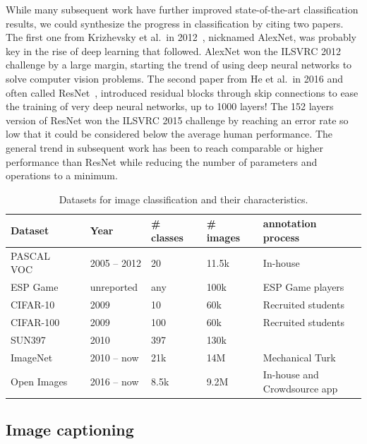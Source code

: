 While many subsequent work have further improved state-of-the-art classification results,
we could synthesize the progress in classification by citing two papers.
The first one from Krizhevsky et al.\ in 2012~\cite{krizhevsky2012imagenet},
nicknamed AlexNet, was probably key in the rise of deep learning that followed.
AlexNet won the ILSVRC 2012 challenge by a large margin,
starting the trend of using deep neural networks to solve computer vision problems.
The second paper from He et al.\ in 2016 and often called ResNet~\cite{he2016deep},
introduced residual blocks through skip connections
to ease the training of very deep neural networks, up to 1000 layers!
The 152 layers version of ResNet won the ILSVRC 2015 challenge
by reaching an error rate so low that
it could be considered below the average human performance.
The general trend in subsequent work has been to reach comparable
or higher performance than ResNet while
reducing the number of parameters and operations to a minimum.

\begin{table}
\centering
\caption{Datasets for image classification and their characteristics.}
\begin{tabular}{lllll}
	Dataset & Year & \# classes & \# images &  annotation process \\
	\midrule
	PASCAL VOC~\cite{Everingham10} & 2005 -- 2012 & 20 & 11.5k &  In-house \\
	ESP Game~\cite{von2005esp} & unreported & any & 100k &  ESP Game players \\
	CIFAR-10~\cite{krizhevsky2009learning} & 2009 & 10 & 60k  & Recruited students \\
	CIFAR-100~\cite{krizhevsky2009learning} & 2009 & 100 & 60k  & Recruited students \\
	SUN397~\cite{xiao2010sun} & 2010 & 397 & 130k &   \\
	ImageNet~\cite{ILSVRC15} & 2010 -- now & 21k & 14M &  Mechanical Turk \\
	Open Images~\cite{OpenImages, OpenImages2} & 2016 -- now & 8.5k & 9.2M & \makecell[l]{In-house and\\Crowdsource app} \\
\end{tabular}%
\label{tab:classification_ds}
\end{table}

\subsection{Image captioning}


